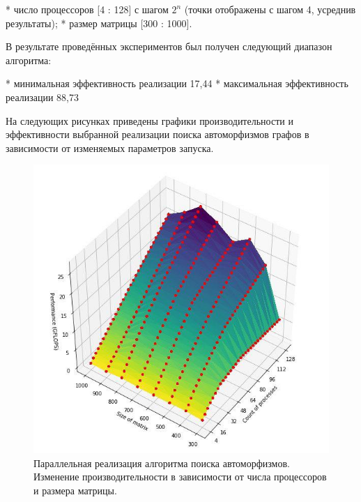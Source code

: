 *	число процессоров [4 : 128] с шагом $ 2^n$ (точки отображены с шагом 4, усреднив результаты);
*	размер матрицы [300 : 1000].

В результате проведённых экспериментов был получен следующий диапазон алгоритма:

*	минимальная эффективность реализации 17,44%
*	максимальная эффективность реализации 88,73%

На следующих рисунках приведены графики производительности и эффективности выбранной реализации поиска автоморфизмов графов в зависимости от изменяемых параметров запуска.

\begin{figure}[ht]
\centering 
    \includegraphics[scale=0.8]{image/p.jpg}
    \caption{Параллельная реализация алгоритма поиска автоморфизмов. Изменение производительности в зависимости от числа процессоров и размера матрицы.}
    \label{srg}
\end{figure}


